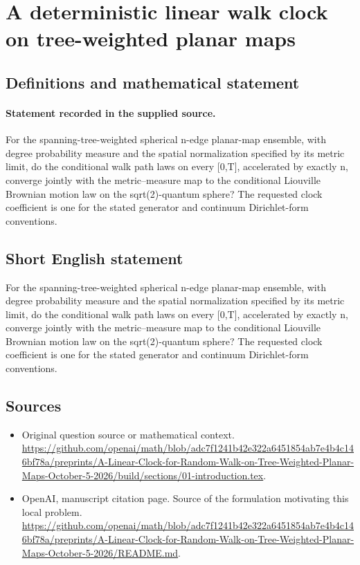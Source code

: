 \documentclass[11pt]{article}
\begin{document}
\section*{A deterministic linear walk clock on tree-weighted planar maps}\label{statement}
\subsection{Definitions and mathematical statement}
\paragraph{Statement recorded in the supplied source.}
For the spanning-tree-weighted spherical n-edge planar-map ensemble, with degree probability measure and the spatial normalization specified by its metric limit, do the conditional walk path laws on every [0,T], accelerated by exactly n, converge jointly with the metric–measure map to the conditional Liouville Brownian motion law on the sqrt(2)-quantum sphere? The requested clock coefficient is one for the stated generator and continuum Dirichlet-form conventions.
\subsection{Short English statement}
For the spanning-tree-weighted spherical n-edge planar-map ensemble, with degree probability measure and the spatial normalization specified by its metric limit, do the conditional walk path laws on every [0,T], accelerated by exactly n, converge jointly with the metric–measure map to the conditional Liouville Brownian motion law on the sqrt(2)-quantum sphere? The requested clock coefficient is one for the stated generator and continuum Dirichlet-form conventions.
\subsection{Sources}
\begin{itemize}
\item[S1] Original question source or mathematical context.
\url{https://github.com/openai/math/blob/adc7f1241b42e322a6451854ab7e4b4c146bf78a/preprints/A-Linear-Clock-for-Random-Walk-on-Tree-Weighted-Planar-Maps-October-5-2026/build/sections/01-introduction.tex}.
\item[S2] OpenAI, manuscript citation page. Source of the formulation motivating this local problem.
\url{https://github.com/openai/math/blob/adc7f1241b42e322a6451854ab7e4b4c146bf78a/preprints/A-Linear-Clock-for-Random-Walk-on-Tree-Weighted-Planar-Maps-October-5-2026/README.md}.
\end{itemize}
\end{document}
